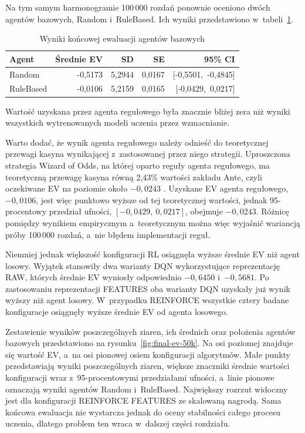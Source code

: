 Na tym samym harmonogramie 100\,000 rozdań ponownie oceniono dwóch
agentów bazowych, Random i~RuleBased. Ich wyniki przedstawiono
w~tabeli~\ref{tab:baseline-ev-50k}.

\begin{table}[htbp]
    \centering
    \caption{Wyniki końcowej ewaluacji agentów bazowych}
    \label{tab:baseline-ev-50k}
    \begin{tabular}{lrrrr}
        \toprule
        Agent & Średnie EV & SD & SE & 95\% CI \\
        \midrule
        Random & -0{,}5173 & 5{,}2944 & 0{,}0167 & [-0{,}5501,\ -0{,}4845] \\
        RuleBased & -0{,}0106 & 5{,}2159 & 0{,}0165 & [-0{,}0429,\ 0{,}0217] \\
        \bottomrule
    \end{tabular}
\end{table}

Wartość uzyskana przez agenta regułowego była znacznie bliżej zera niż
wyniki wszystkich wytrenowanych modeli uczenia przez wzmacnianie.

Warto dodać, że wynik agenta regułowego należy odnieść do teoretycznej przewagi kasyna
wynikającej z~zastosowanej przez niego strategii. Uproszczona strategia
Wizard of Odds, na której oparto reguły agenta regułowego, ma
teoretyczną przewagę kasyna równą 2,43\% wartości zakładu Ante, czyli
oczekiwane EV na poziomie około $-0{,}0243$ \cite{wizard_uth}. Uzyskane
EV agenta regułowego, $-0{,}0106$, jest więc punktowo wyższe od tej
teoretycznej wartości, jednak 95-procentowy przedział ufności,
$[-0{,}0429,\ 0{,}0217]$, obejmuje $-0{,}0243$. Różnicę pomiędzy
wynikiem empirycznym a~teoretycznym można więc wyjaśnić wariancją
próby 100\,000 rozdań, a~nie błędem implementacji reguł.

Niemniej jednak większość konfiguracji RL osiągnęła wyższe średnie EV niż
agent losowy. Wyjątek stanowiły dwa warianty DQN wykorzystujące
reprezentację RAW, których średnie EV wyniosły odpowiednio
$-0{,}6450$ i~$-0{,}5681$. Po zastosowaniu reprezentacji FEATURES
oba warianty DQN uzyskały już wynik wyższy niż agent losowy.
W~przypadku REINFORCE wszystkie cztery badane konfiguracje osiągnęły
wyższe średnie EV od agenta losowego.

Zestawienie wyników poszczególnych ziaren, ich średnich oraz położenia
agentów bazowych przedstawiono na rysunku~\ref{fig:final-ev-50k}. Na osi
poziomej znajduje się wartość EV, a~na osi pionowej osiem konfiguracji algorytmów.
Małe punkty przedstawiają
wyniki poszczególnych ziaren, większe znaczniki średnie wartości
konfiguracji wraz z~95-procentowymi przedziałami ufności, a~linie
pionowe oznaczają wyniki agentów Random i~RuleBased. Największy
rozrzut widoczny jest dla konfiguracji REINFORCE FEATURES ze skalowaną
nagrodą. Sama końcowa ewaluacja nie wystarcza jednak do oceny
stabilności całego procesu uczenia, dlatego problem ten wraca
w~dalszej części rozdziału.

